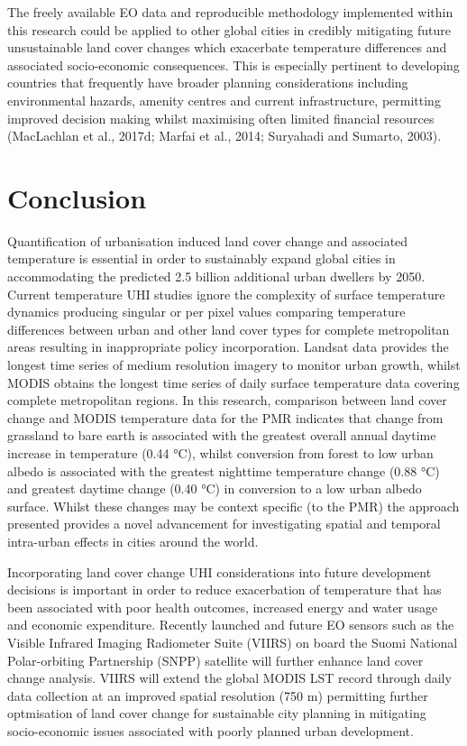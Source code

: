 \documentclass[]{book}
\begin{document}
The freely available EO data and reproducible methodology implemented
within this research could be applied to other global cities in credibly
mitigating future unsustainable land cover changes which exacerbate
temperature differences and associated socio-economic consequences. This
is especially pertinent to developing countries that frequently have
broader planning considerations including environmental hazards, amenity
centres and current infrastructure, permitting improved decision making
whilst maximising often limited financial resources (MacLachlan et al.,
2017d; Marfai et al., 2014; Suryahadi and Sumarto, 2003).

\section{Conclusion}\label{conclusion-1}

Quantification of urbanisation induced land cover change and associated
temperature is essential in order to sustainably expand global cities in
accommodating the predicted 2.5 billion additional urban dwellers by
2050. Current temperature UHI studies ignore the complexity of surface
temperature dynamics producing singular or per pixel values comparing
temperature differences between urban and other land cover types for
complete metropolitan areas resulting in inappropriate policy
incorporation. Landsat data provides the longest time series of medium
resolution imagery to monitor urban growth, whilst MODIS obtains the
longest time series of daily surface temperature data covering complete
metropolitan regions. In this research, comparison between land cover
change and MODIS temperature data for the PMR indicates that change from
grassland to bare earth is associated with the greatest overall annual
daytime increase in temperature (0.44 °C), whilst conversion from forest
to low urban albedo is associated with the greatest nighttime
temperature change (0.88 °C) and greatest daytime change (0.40 °C) in
conversion to a low urban albedo surface. Whilst these changes may be
context specific (to the PMR) the approach presented provides a novel
advancement for investigating spatial and temporal intra-urban effects
in cities around the world.

Incorporating land cover change UHI considerations into future
development decisions is important in order to reduce exacerbation of
temperature that has been associated with poor health outcomes,
increased energy and water usage and economic expenditure. Recently
launched and future EO sensors such as the Visible Infrared Imaging
Radiometer Suite (VIIRS) on board the Suomi National Polar-orbiting
Partnership (SNPP) satellite will further enhance land cover change
analysis. VIIRS will extend the global MODIS LST record through daily
data collection at an improved spatial resolution (750 m) permitting
further optmisation of land cover change for sustainable city planning
in mitigating socio-economic issues associated with poorly planned urban
development.
\end{document}
